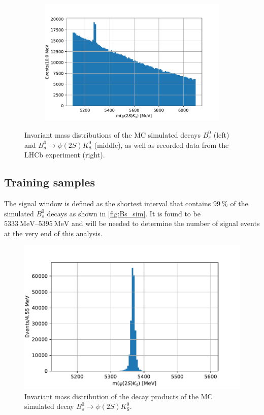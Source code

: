 \begin{figure}[tb]
\begin{subfigure}{.32\textwidth}
  \end{subfigure}
  \begin{subfigure}{.32\textwidth}
    \includegraphics[width=\linewidth]{../plots/data_hist.pdf}
  \end{subfigure}
  \caption{Invariant mass distributions of the MC simulated decays $B^0_s$ (left) and $B^0_d \to \psi(2S) K^0_\mathrm{S}$ (middle), as well as recorded data from the LHCb experiment (right).}
  \label{fig:dists}
\end{figure}

\subsection{Training samples}
The signal window is defined as the shortest interval that contains $\SI{99}{\percent}$ of the simulated $B^0_s$ decays as shown in \autoref{fig:Bs_sim}.
It is found to be $\SIrange{5333}{5395}{\mega\eV}$ and will be needed to determine the number of signal events at the very end of this analysis.

\begin{figure}[tb]
  \centering
  \includegraphics{../plots/sim_hist.pdf}
  \caption{Invariant mass distribution of the decay products of the MC simulated decay $B^0_s \to \psi(2S)K^0_\mathrm{S}$.}
  \label{fig:Bs_sim}
\end{figure}

